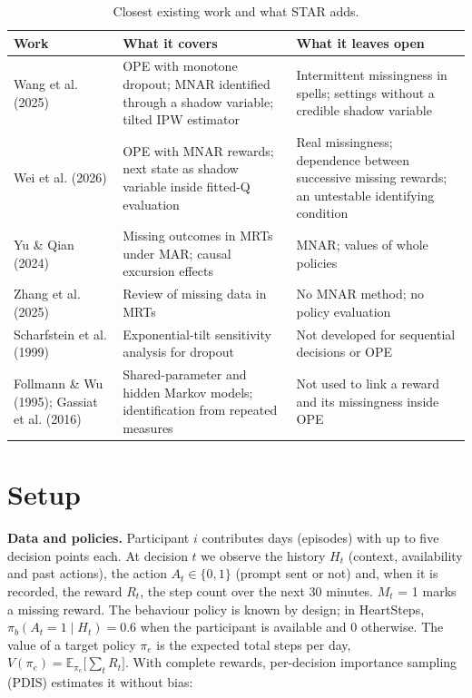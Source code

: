 \documentclass[12pt]{article}
\begin{document}
\begin{table}[!htbp]\centering\small
\caption{Closest existing work and what STAR adds.}
\begin{tabularx}{\textwidth}{>{\raggedright\arraybackslash}p{}XX}
\toprule
\textbf{Work} & \textbf{What it covers} & \textbf{What it leaves open} \\
\midrule
Wang et al. (2025) & OPE with monotone dropout; MNAR identified through a shadow variable; tilted IPW estimator & Intermittent missingness in spells; settings without a credible shadow variable \\
Wei et al. (2026) & OPE with MNAR rewards; next state as shadow variable inside fitted-Q evaluation & Real missingness; dependence between successive missing rewards; an untestable identifying condition \\
Yu \& Qian (2024) & Missing outcomes in MRTs under MAR; causal excursion effects & MNAR; values of whole policies \\
Zhang et al. (2025) & Review of missing data in MRTs & No MNAR method; no policy evaluation \\
Scharfstein et al. (1999) & Exponential-tilt sensitivity analysis for dropout & Not developed for sequential decisions or OPE \\
Follmann \& Wu (1995); Gassiat et al. (2016) & Shared-parameter and hidden Markov models; identification from repeated measures & Not used to link a reward and its missingness inside OPE \\
\bottomrule
\end{tabularx}
\end{table}

\section{Setup}

\textbf{Data and policies.} Participant $i$ contributes days (episodes) with up to five decision points each. At decision $t$ we observe the history $H_{t}$ (context, availability and past actions), the action $A_t\in\{0,1\}$ (prompt sent or not) and, when it is recorded, the reward $R_{t}$, the step count over the next 30 minutes. $M_{t}$ = 1 marks a missing reward. The behaviour policy is known by design; in HeartSteps, $\pi_b(A_t=1\mid H_t)=0.6$ when the participant is available and 0 otherwise. The value of a target policy $\pi_e$ is the expected total steps per day, $V(\pi_e)=\mathbb{E}_{\pi_e}\big[\sum_t R_t\big]$. With complete rewards, per-decision importance sampling (PDIS) estimates it without bias:
\end{document}
